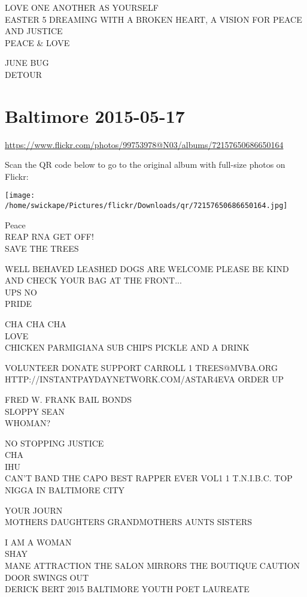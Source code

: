 \documentclass[10pt,letterpaper]{article}
\begin{document}
LOVE ONE ANOTHER AS YOURSELF\\
EASTER 5 DREAMING WITH A BROKEN HEART, A VISION FOR PEACE AND JUSTICE\\
PEACE \& LOVE

JUNE BUG\\
DETOUR


\section*{Baltimore 2015-05-17}

\url{https://www.flickr.com/photos/99753978@N03/albums/72157650686650164}

Scan the QR code below to go to the original album with full-size photos on Flickr:

\texttt{[image: /home/swickape/Pictures/flickr/Downloads/qr/72157650686650164.jpg]}


Peace\\
REAP RNA GET OFF!\\
SAVE THE TREES

WELL BEHAVED LEASHED DOGS ARE WELCOME PLEASE BE KIND AND CHECK YOUR BAG AT THE FRONT...\\
UPS NO\\
PRIDE

CHA CHA CHA\\
LOVE\\
CHICKEN PARMIGIANA SUB CHIPS PICKLE AND A DRINK

VOLUNTEER DONATE SUPPORT CARROLL 1 TREES@MVBA.ORG\\
HTTP://INSTANTPAYDAYNETWORK.COM/ASTAR4EVA ORDER UP

FRED W. FRANK BAIL BONDS\\
SLOPPY SEAN\\
WHOMAN?

NO STOPPING JUSTICE\\
CHA\\
IHU\\
CAN'T BAND THE CAPO BEST RAPPER EVER VOL1 1 T.N.I.B.C. TOP NIGGA IN BALTIMORE CITY

YOUR JOURN\\
MOTHERS DAUGHTERS GRANDMOTHERS AUNTS SISTERS

I AM A WOMAN\\
SHAY\\
MANE ATTRACTION THE SALON MIRRORS THE BOUTIQUE CAUTION DOOR SWINGS OUT\\
DERICK BERT 2015 BALTIMORE YOUTH POET LAUREATE
\end{document}
